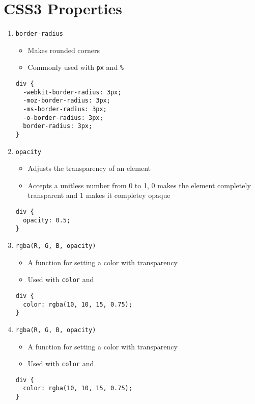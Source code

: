 \documentclass[10pt, twocolumn]{article}
\begin{document}
\section{CSS3 Properties}
\begin{enumerate}

\item \texttt{border-radius}
\begin{itemize}
\item Makes rounded corners
\item Commonly used with \texttt{px} and \texttt{\%}
\end{itemize}
\begin{lstlisting}[frame=single]
div {
  -webkit-border-radius: 3px;
  -moz-border-radius: 3px;
  -ms-border-radius: 3px;
  -o-border-radius: 3px;
  border-radius: 3px;
}
\end{lstlisting}

\item \texttt{opacity}
\begin{itemize}
\item Adjusts the transparency of an element 
\item Accepts a unitless number from 0 to 1, 0 makes the element completely transparent and 1 makes it completey opaque
\end{itemize}
\begin{lstlisting}[frame=single]
div {
  opacity: 0.5;
}
\end{lstlisting}

\item \texttt{rgba(R, G, B, opacity)}
\begin{itemize}
\item A function for setting a color with transparency
\item Used with \texttt{color} and 
\end{itemize}
\begin{lstlisting}[frame=single]
div {
  color: rgba(10, 10, 15, 0.75);
}
\end{lstlisting}

\item \texttt{rgba(R, G, B, opacity)}
\begin{itemize}
\item A function for setting a color with transparency
\item Used with \texttt{color} and 
\end{itemize}
\begin{lstlisting}[frame=single]
div {
  color: rgba(10, 10, 15, 0.75);
}
\end{lstlisting}


\end{enumerate}
\end{document}
